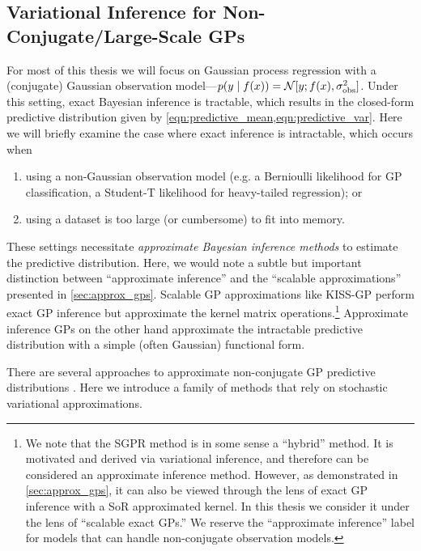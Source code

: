\subsection{Variational Inference for Non-Conjugate/Large-Scale GPs}
\label{sec:variational}
For most of this thesis we will focus on Gaussian process regression with a (conjugate) Gaussian observation model---$p(y \mid f(x)) = \normaldist{y; f(x)}{\sigma_\text{obs}^2}$.
Under this setting, exact Bayesian inference is tractable, which results in the closed-form predictive distribution given by \cref{eqn:predictive_mean,eqn:predictive_var}.
Here we will briefly examine the case where exact inference is intractable, which occurs when
%
\begin{enumerate}
  \item using a non-Gaussian observation model (e.g. a Bernioulli likelihood for GP classification, a Student-T likelihood for heavy-tailed regression); or
  \item using a dataset is too large (or cumbersome) to fit into memory.
\end{enumerate}
%
These settings necessitate \emph{approximate Bayesian inference methods} to estimate the predictive distribution.
Here, we would note a subtle but important distinction between ``approximate inference'' and the ``scalable approximations'' presented in \cref{sec:approx_gps}.
Scalable GP approximations like KISS-GP perform exact GP inference but approximate the kernel matrix operations.\footnote{
  We note that the SGPR method \cite{titsias2009variational} is in some sense a ``hybrid'' method.
  It is motivated and derived via variational inference, and therefore can be considered an approximate inference method.
  However, as demonstrated in \cref{sec:approx_gps}, it can also be viewed through the lens of exact GP inference with a SoR approximated kernel.
  In this thesis we consider it under the lens of ``scalable exact GPs.''
  We reserve the ``approximate inference'' label for models that can handle non-conjugate observation models.
}
Approximate inference GPs on the other hand approximate the intractable predictive distribution with a simple (often Gaussian) functional form.

There are several approaches to approximate non-conjugate GP predictive distributions \citep{minka2001family,rasmussen2006gaussian,hensman2015mcmc,li2015stochastic}.
Here we introduce a family of methods that rely on stochastic variational approximations.

